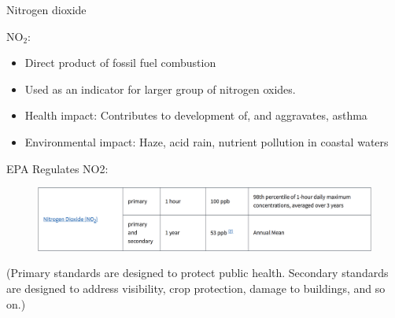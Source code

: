 \documentclass[aspectratio=169, handout]{beamer}
\begin{document}
\begin{frame}{Nitrogen dioxide}

NO$_2$:
\begin{itemize}
\item Direct product of fossil fuel combustion
\item Used as an indicator for larger group of nitrogen oxides.
\item Health impact: Contributes to development of, and aggravates, asthma 
\item Environmental impact: Haze, acid rain, nutrient pollution in coastal waters
\end{itemize}

EPA Regulates NO2:
\begin{figure}
\includegraphics[width=\textwidth]{EPA_NO2_reg}
\end{figure}

\vspace{-4mm}

{\footnotesize (Primary standards are designed to protect public health.  Secondary standards are designed to address visibility, crop protection, damage to buildings, and so on.)}
\end{frame}
\end{document}

